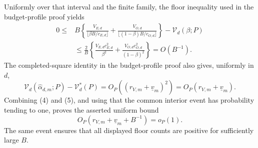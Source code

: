 Uniformly over that interval and the finite family, the floor inequality used in the budget-profile proof yields
\[
\begin{aligned}
0\le{}&B\left\{\frac{V_{E,d}}{\lfloor\beta B/c_{E,d}\rfloor}
 +\frac{V_{O,d}}{\lfloor(1-\beta)B/c_{O,d}\rfloor}\right\}
 -\mathcal V_d(\beta;P)\\
&\le\frac2B\left\{\frac{V_{E,d}c_{E,d}^2}{\beta^2}
 +\frac{V_{O,d}c_{O,d}^2}{(1-\beta)^2}\right\}=O(B^{-1}).
\end{aligned} \tag{4}
\]
The completed-square identity in the budget-profile proof also gives, uniformly in \(d\),
\[
 \mathcal V_d(\widehat\alpha_{d,m};P)-\mathcal V_d^*(P)
 =O_P((r_{V,m}+\underline v_m)^2)
 =O_P(r_{V,m}+\underline v_m). \tag{5}
\]
Combining (4) and (5), and using that the common interior event has probability tending to one, proves the asserted uniform bound
\[
 O_P(r_{V,m}+\underline v_m+B^{-1})=o_P(1).
\]
The same event ensures that all displayed floor counts are positive for sufficiently large \(B\).